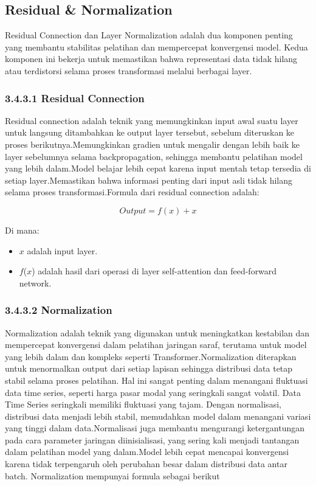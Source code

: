 \subsection{Residual \& Normalization}
Residual Connection dan Layer Normalization adalah dua komponen penting yang membantu stabilitas pelatihan dan mempercepat konvergensi model. Kedua komponen ini bekerja untuk memastikan bahwa representasi data tidak hilang atau terdistorsi selama proses transformasi melalui berbagai layer.

\subsubsection*{3.4.3.1 Residual Connection}
Residual connection adalah teknik yang memungkinkan input awal suatu layer untuk langsung ditambahkan ke output layer tersebut, sebelum diteruskan ke proses berikutnya.Memungkinkan gradien untuk mengalir dengan lebih baik ke layer sebelumnya selama backpropagation, sehingga membantu pelatihan model yang lebih dalam.Model belajar lebih cepat karena input mentah tetap tersedia di setiap layer.Memastikan bahwa informasi penting dari input asli tidak hilang selama proses transformasi.Formula dari residual connection adalah: 

\begin{equation}
Output = f(x) + x
\end{equation}

Di mana: 
\begin{itemize}
        \item \( x \) adalah input layer.
        \item \( f \)(\( x \)) adalah hasil dari operasi di layer self-attention dan feed-forward network.
    \end{itemize}


\subsubsection*{3.4.3.2 Normalization}
Normalization adalah teknik yang digunakan untuk meningkatkan kestabilan dan mempercepat konvergensi dalam pelatihan jaringan saraf, terutama untuk model yang lebih dalam dan kompleks seperti Transformer.Normalization diterapkan untuk menormalkan output dari setiap lapisan sehingga distribusi data tetap stabil selama proses pelatihan. Hal ini sangat penting dalam menangani fluktuasi data time series, seperti harga pasar modal yang seringkali sangat volatil. Data Time Series seringkali memiliki fluktuasi yang tajam. Dengan normalisasi, distribusi data menjadi lebih stabil, memudahkan model dalam menangani variasi yang tinggi dalam data.Normalisasi juga membantu mengurangi ketergantungan pada cara parameter jaringan diinisialisasi, yang sering kali menjadi tantangan dalam pelatihan model yang dalam.Model lebih cepat mencapai konvergensi karena tidak terpengaruh oleh perubahan besar dalam distribusi data antar batch. Normalization mempunyai formula sebagai berikut

